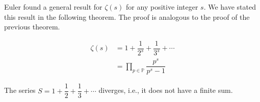 Euler found a general result for $\zeta(s)$ for any positive integer $s$. We have stated this result in the following theorem. The proof is analogous to the proof of the previous theorem.
	\begin{theorem}
		\begin{align*}
			\zeta(s)
				& =1+\dfrac{1}{2^s}+\dfrac{1}{3^s}+\cdots\\
				& =\prod_{p\in\mathbb{P} }\dfrac{p^s}{p^s-1}
		\end{align*}
	\end{theorem}

	\begin{theorem}
		The series $S=1+\dfrac{1}{2}+\dfrac{1}{3}+\cdots$ diverges, i.e., it does not have a finite sum.\label{thm:zeta1div}
	\end{theorem}

